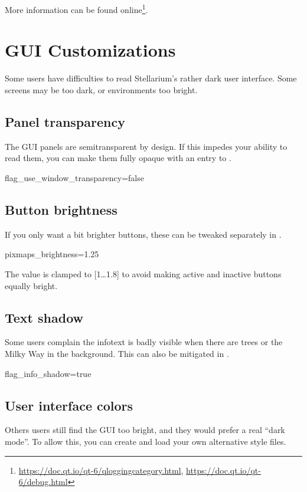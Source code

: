 More information can be found online\footnote{\scriptsize{\url{https://doc.qt.io/qt-6/qloggingcategory.html}, \url{https://doc.qt.io/qt-6/debug.html}}}.


\section{GUI Customizations}

Some users have difficulties to read Stellarium's rather dark user
interface. Some screens may be too dark, or environments too
bright. 

\subsection{Panel transparency}
\label{sec:CommandLineOptions:Special:PanelTransparency}
The GUI panels are semitransparent by design. If this impedes your ability to read them, you can 
make them fully opaque with an entry to .
\begin{configfile}
[gui]
flag_use_window_transparency=false
\end{configfile}

\subsection{Button brightness}
\label{sec:CommandLineOptions:Special:ButtonBrightness}
If you only want a bit brighter buttons, these can be tweaked separately in .
\begin{configfile}
[gui]
pixmaps_brightness=1.25
\end{configfile}
The value is clamped to [1\ldots1.8] to avoid making active and inactive buttons equally bright.

\subsection{Text shadow}
\label{sec:CommandLineOptions:Special:TextShadow}
Some users complain the infotext is badly visible when there are trees or the Milky Way in the background. This can also be mitigated in .
\begin{configfile}
[gui]
flag_info_shadow=true
\end{configfile}


\subsection{User interface colors}
\label{sec:CommandLineOptions:Special:CSS}
Others users still find the GUI too bright, and they would prefer a
real ``dark mode''. To allow this, you can create and load your own alternative style files.

